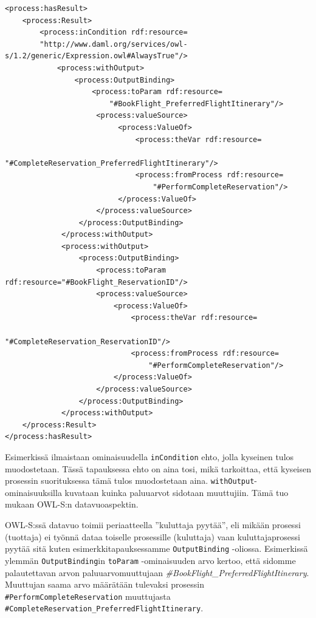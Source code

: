 \documentclass[finnish]{tktltiki2}
\theoremstyle{definition}
\theoremstyle{remark}
\begin{document}
\begin{verbatim}
<process:hasResult>
    <process:Result>
        <process:inCondition rdf:resource=
        "http://www.daml.org/services/owl-s/1.2/generic/Expression.owl#AlwaysTrue"/>
            <process:withOutput>
                <process:OutputBinding>
                    <process:toParam rdf:resource=
                        "#BookFlight_PreferredFlightItinerary"/>
                     <process:valueSource>
                          <process:ValueOf>
                              <process:theVar rdf:resource=
                                  "#CompleteReservation_PreferredFlightItinerary"/>
                              <process:fromProcess rdf:resource=
                                  "#PerformCompleteReservation"/>
                          </process:ValueOf>
                     </process:valueSource>
                 </process:OutputBinding>
             </process:withOutput>
             <process:withOutput>
                 <process:OutputBinding>
                     <process:toParam rdf:resource="#BookFlight_ReservationID"/>
                     <process:valueSource>
                         <process:ValueOf>
                             <process:theVar rdf:resource=
                                 "#CompleteReservation_ReservationID"/>
                             <process:fromProcess rdf:resource=
                                 "#PerformCompleteReservation"/>
                         </process:ValueOf>
                     </process:valueSource>
                 </process:OutputBinding>
             </process:withOutput>
    </process:Result>
</process:hasResult>
\end{verbatim}


Esimerkissä ilmaistaan ominaisuudella \texttt{inCondition} ehto, jolla kyseinen tulos muodostetaan. Tässä tapauksessa ehto on aina tosi, mikä tarkoittaa, että kyseisen prosessin suorituksessa tämä tulos muodostetaan aina. \texttt{withOutput}-ominaisuuksilla kuvataan kuinka paluuarvot sidotaan muuttujiin. Tämä tuo mukaan OWL-S:n datavuoaspektin. 

OWL-S:ssä datavuo toimii periaatteella ''kuluttaja pyytää'', eli mikään prosessi (tuottaja) ei työnnä dataa toiselle prosessille (kuluttaja) vaan kuluttajaprosessi pyytää sitä kuten esimerkkitapauksessamme \texttt{OutputBinding} -oliossa. Esimerkissä ylemmän \texttt{OutputBinding}in \texttt{toParam} -ominaisuuden arvo kertoo, että sidomme palautettavan arvon paluuarvomuuttujaan \textit{\#BookFlight\_PreferredFlightItinerary}. Muuttujan saama arvo määrätään tulevaksi prosessin  \texttt{\#PerformCompleteReservation} muuttujasta \texttt{\#CompleteReservation\_PreferredFlightItinerary}. 
\end{document}
